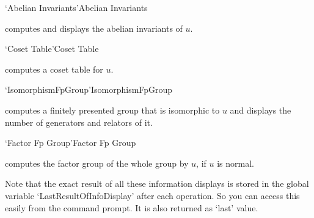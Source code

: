 \>`Abelian Invariants'{Abelian Invariants}

computes  and  displays  the  abelian invariants  of  $u$.

\>`Coset Table'{Coset Table}

computes   a   coset table for   $u$.

\>`IsomorphismFpGroup'{IsomorphismFpGroup}

computes a finitely presented group that is isomorphic to $u$ and displays
the number of generators and relators of it.

\>`Factor Fp Group'{Factor Fp Group}

computes the factor group  of the whole group by $u$, if $u$ is normal.

\bigskip

Note that the exact result of all these information displays is stored in
the global variable `LastResultOfInfoDisplay' after each operation. So you
can access this easily from the {\GAP} command prompt. It is also returned
as `last' value.


